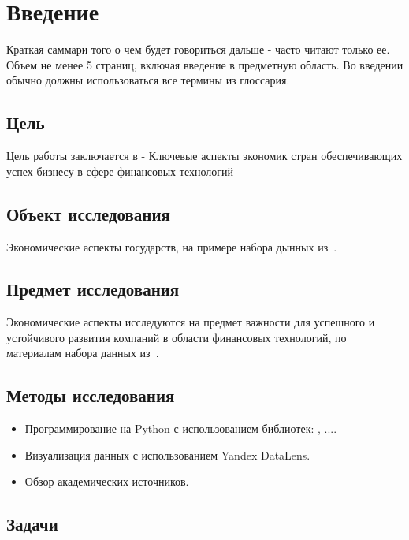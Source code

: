 \section{Введение}

Краткая саммари того о чем будет говориться дальше - часто читают только ее. Объем не менее 5 страниц, включая введение в предметную область. Во введении обычно должны использоваться все термины из глоссария.

\subsection{Цель}
Цель работы заключается в - Ключевые аспекты экономик стран обеспечивающих успех бизнесу в сфере финансовых технологий

\subsection{Объект исследования} 
Экономические аспекты государств, на примере набора дынных из~\cite{}.

\subsection{Предмет исследования}
Экономические аспекты исследуются на предмет важности для успешного и устойчивого развития компаний в области финансовых технологий, по материалам набора данных из~\cite{?}.


\subsection{Методы исследования}
\begin{itemize}
    \item Программирование на Python с использованием библиотек:  \cite{?}, ....
    \item Визуализация данных с использованием Yandex DataLens.
    \item Обзор академических источников.
\end{itemize}

\subsection{Задачи}


